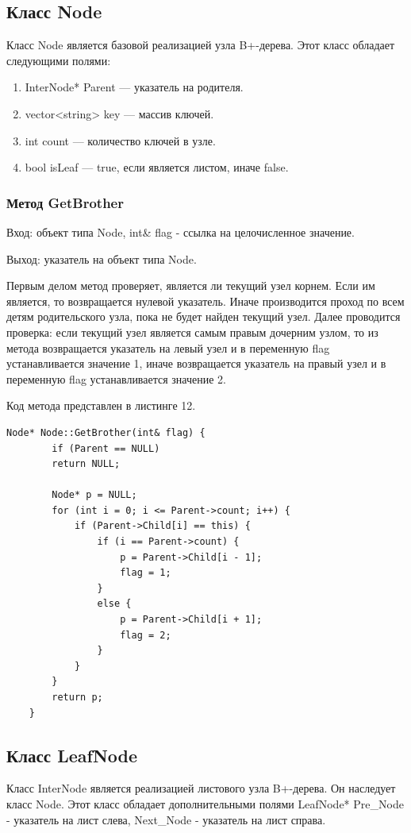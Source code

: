 \documentclass[11pt,a4paper,final]{article} %
\begin{document}
\subsection{Класс Node}
Класс Node является базовой реализацией узла B+-дерева. Этот класс обладает следующими полями:
\begin{enumerate}
	\item InterNode* Parent --- указатель на родителя.
	\item vector<string> key --- массив ключей.
	\item int count --- количество ключей в узле.
	\item bool isLeaf --- true, если является листом, иначе false.
\end{enumerate}

\subsubsection{Метод GetBrother}
Вход: объект типа Node, int\& flag - ссылка на целочисленное значение. \par
Выход: указатель на объект типа Node. \par
Первым делом метод проверяет, является ли текущий узел корнем. Если им является, то возвращается нулевой указатель. Иначе производится проход по всем детям родительского узла, пока не будет найден текущий узел. Далее проводится проверка: если текущий узел является самым правым дочерним узлом, то из метода возвращается указатель на левый узел и в переменную flag устанавливается значение 1, иначе возвращается указатель на правый узел и в переменную flag устанавливается значение 2. \par
Код метода представлен в листинге 12.
\begin{lstlisting}[label=GetBrother, caption = Метод GetBrother]
	Node* Node::GetBrother(int& flag) {
		if (Parent == NULL)
		return NULL;
		
		Node* p = NULL;
		for (int i = 0; i <= Parent->count; i++) {
			if (Parent->Child[i] == this) {
				if (i == Parent->count) {
					p = Parent->Child[i - 1];
					flag = 1;
				}
				else {
					p = Parent->Child[i + 1];
					flag = 2;
				}
			}
		}
		return p;
	}
\end{lstlisting}


\subsection{Класс LeafNode}
Класс InterNode является реализацией листового узла B+-дерева. Он наследует класс Node. Этот класс обладает дополнительными полями LeafNode* Pre\_Node - указатель на лист слева, Next\_Node - указатель на лист справа. 
\end{document}
